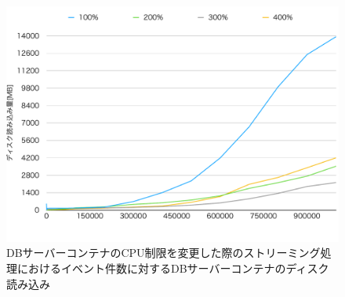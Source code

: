 \documentclass[../../../../../main]{subfiles}
\begin{document}
    \begin{figure}[H]
        \centering
        \includegraphics[width=12cm]{graph}
        \caption{DBサーバーコンテナのCPU制限を変更した際のストリーミング処理におけるイベント件数に対するDBサーバーコンテナのディスク読み込み}
        \label{fig:stream-change-db-cpu-limit-db-disk-out-app_4_8192-db_1024}
    \end{figure}
\end{document}
